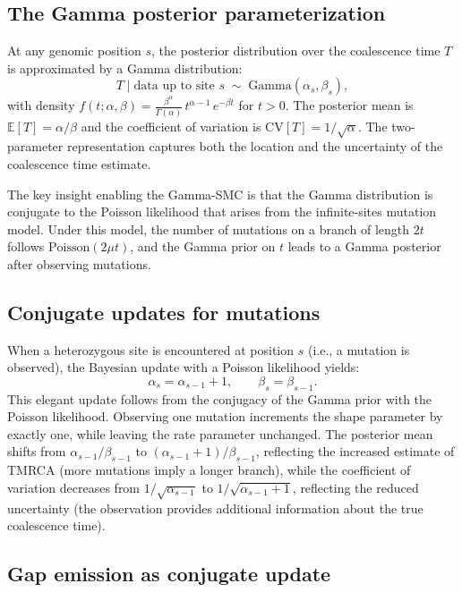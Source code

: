 \documentclass[10pt,letterpaper]{article}
\begin{document}
\subsection{The Gamma posterior parameterization}

At any genomic position $s$, the posterior distribution over the coalescence time $T$ is approximated by a Gamma distribution:
\begin{equation}
T \mid \text{data up to site } s \;\sim\; \mathrm{Gamma}(\alpha_s, \beta_s),
\end{equation}
with density $f(t; \alpha, \beta) = \frac{\beta^\alpha}{\Gamma(\alpha)}\, t^{\alpha-1}\, e^{-\beta t}$ for $t > 0$. The posterior mean is $\mathbb{E}[T] = \alpha/\beta$ and the coefficient of variation is $\mathrm{CV}[T] = 1/\sqrt{\alpha}$. The two-parameter representation captures both the location and the uncertainty of the coalescence time estimate.

The key insight enabling the Gamma-SMC is that the Gamma distribution is conjugate to the Poisson likelihood that arises from the infinite-sites mutation model. Under this model, the number of mutations on a branch of length $2t$ follows $\mathrm{Poisson}(2\mu t)$, and the Gamma prior on $t$ leads to a Gamma posterior after observing mutations.

\subsection{Conjugate updates for mutations}

When a heterozygous site is encountered at position $s$ (i.e., a mutation is observed), the Bayesian update with a Poisson likelihood yields:
\begin{equation}
\alpha_s = \alpha_{s-1} + 1, \qquad \beta_s = \beta_{s-1}.
\label{eq:mutation_update}
\end{equation}
This elegant update follows from the conjugacy of the Gamma prior with the Poisson likelihood. Observing one mutation increments the shape parameter by exactly one, while leaving the rate parameter unchanged. The posterior mean shifts from $\alpha_{s-1}/\beta_{s-1}$ to $(\alpha_{s-1}+1)/\beta_{s-1}$, reflecting the increased estimate of TMRCA (more mutations imply a longer branch), while the coefficient of variation decreases from $1/\sqrt{\alpha_{s-1}}$ to $1/\sqrt{\alpha_{s-1}+1}$, reflecting the reduced uncertainty (the observation provides additional information about the true coalescence time).

\subsection{Gap emission as conjugate update}
\end{document}
